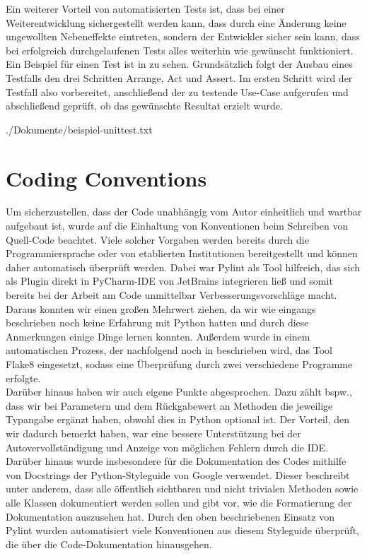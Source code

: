 Ein weiterer Vorteil von automatisierten Tests ist, dass bei einer Weiterentwicklung sichergestellt werden kann, dass
durch eine Änderung keine ungewollten Nebeneffekte eintreten, sondern der Entwickler sicher sein kann, dass bei
erfolgreich durchgelaufenen Tests alles weiterhin wie gewünscht funktioniert. \\

Ein Beispiel für einen Test ist in  zu sehen.
Grundsätzlich folgt der Ausbau eines Testfalls den drei Schritten Arrange, Act und Assert.
Im ersten Schritt wird der Testfall also vorbereitet, anschließend der zu testende Use-Case aufgerufen und abschließend
geprüft, ob das gewünschte Resultat erzielt wurde. 


{./Dokumente/beispiel-unittest.txt}

\section{Coding Conventions}
\label{sec:code-conventions}

Um sicherzustellen, dass der Code unabhängig vom Autor einheitlich und wartbar aufgebaut ist, wurde auf die Einhaltung
von Konventionen beim Schreiben von Quell-Code beachtet. 
Viele solcher Vorgaben werden bereits durch die Programmiersprache oder von etablierten Institutionen bereitgestellt und
können daher automatisch überprüft werden. 
Dabei war Pylint  als Tool hilfreich, das sich als Plugin direkt in PyCharm-IDE von JetBrains 
integrieren ließ und somit bereits bei der Arbeit am Code unmittelbar Verbesserungsvorschläge macht.
Daraus konnten wir einen großen Mehrwert ziehen, da wir wie eingangs beschrieben noch keine Erfahrung mit Python hatten
und durch diese Anmerkungen einige Dinge lernen konnten.
Außerdem wurde in einem automatischen Prozess, der nachfolgend noch in  beschrieben wird,
das Tool Flake8  eingesetzt, sodass eine Überprüfung durch zwei verschiedene Programme erfolgte. \\

Darüber hinaus haben wir auch eigene Punkte abgesprochen.
Dazu zählt bspw., dass wir bei Parametern und dem Rückgabewert an Methoden die jeweilige Typangabe ergänzt haben, obwohl
dies in Python optional ist.
Der Vorteil, den wir dadurch bemerkt haben, war eine bessere Unterstützung bei der Autovervollständigung und Anzeige
von möglichen Fehlern durch die IDE\@.
Darüber hinaus wurde insbesondere für die Dokumentation des Codes mithilfe von Docstrings der Python-Styleguide von
Google  verwendet.
Dieser beschreibt unter anderem, dass alle öffentlich sichtbaren und nicht trivialen Methoden sowie alle Klassen
dokumentiert werden sollen und gibt vor, wie die Formatierung der Dokumentation auszusehen hat.
Durch den oben beschriebenen Einsatz von Pylint wurden automatisiert viele Konventionen aus diesem Styleguide überprüft,
die über die Code-Dokumentation hinausgehen.
